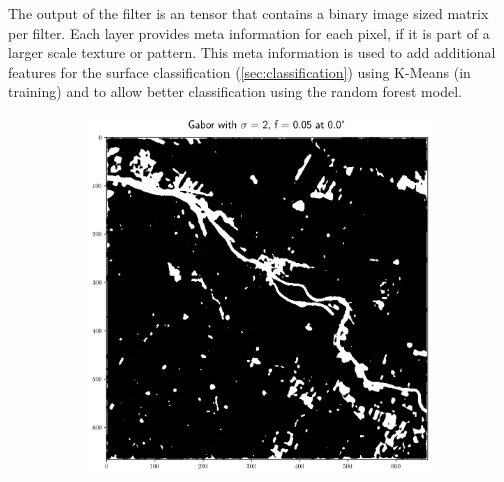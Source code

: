 \documentclass[12pt,a4paper, english,twoside]{article}
\begin{document}
    The output of the filter is an tensor that contains a binary image sized matrix per filter. Each layer provides meta information for each pixel, if it is part of a larger scale texture or pattern. 
    This meta information is used to add additional features for the surface classification (\cref{sec:classification}) using K-Means (in training) and to allow better classification using the random forest model.
    \begin{figure}[!htbp]
       \centering
     \begin{subfigure}[b]{0.45\textwidth}
         \centering
         \includegraphics[width=\textwidth]{img/Features_2_005_0.png}
         \label{fig:feat01}
     \end{subfigure}
     \hfill
     \begin{subfigure}[b]{0.45\textwidth}
         \centering

\end{subfigure}
\end{figure}
\end{document}
